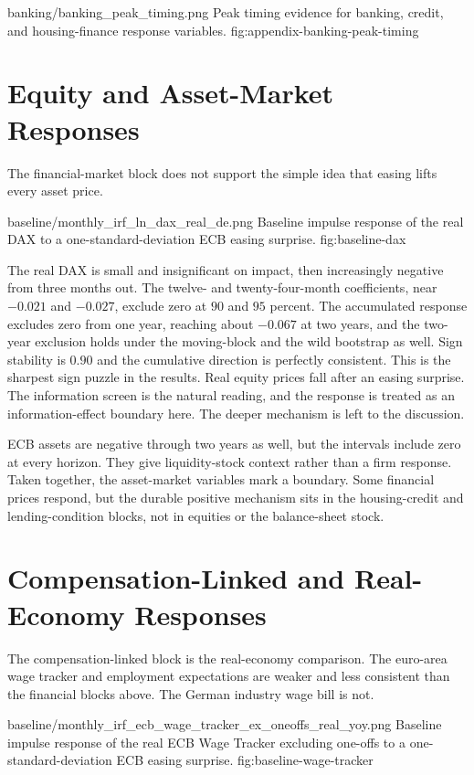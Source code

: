 \thesisfigure
  {banking/banking_peak_timing.png}
  {Peak timing evidence for banking, credit, and housing-finance response variables.}
  {fig:appendix-banking-peak-timing}

\section{Equity and Asset-Market Responses}

The financial-market block does not support the simple idea that easing lifts every asset price.

\thesisfigure
  {baseline/monthly_irf_ln_dax_real_de.png}
  {Baseline impulse response of the real DAX to a one-standard-deviation ECB easing surprise.}
  {fig:baseline-dax}

The real DAX is small and insignificant on impact, then increasingly negative from three months out. The twelve- and twenty-four-month coefficients, near \(-0.021\) and \(-0.027\), exclude zero at \(90\) and \(95\) percent. The accumulated response excludes zero from one year, reaching about \(-0.067\) at two years, and the two-year exclusion holds under the moving-block and the wild bootstrap as well. Sign stability is \(0.90\) and the cumulative direction is perfectly consistent. This is the sharpest sign puzzle in the results. Real equity prices fall after an easing surprise. The information screen is the natural reading, and the response is treated as an information-effect boundary here. The deeper mechanism is left to the discussion.

ECB assets are negative through two years as well, but the intervals include zero at every horizon. They give liquidity-stock context rather than a firm response. Taken together, the asset-market variables mark a boundary. Some financial prices respond, but the durable positive mechanism sits in the housing-credit and lending-condition blocks, not in equities or the balance-sheet stock.

\section{Compensation-Linked and Real-Economy Responses}

The compensation-linked block is the real-economy comparison. The euro-area wage tracker and employment expectations are weaker and less consistent than the financial blocks above. The German industry wage bill is not.

\thesisfigure
  {baseline/monthly_irf_ecb_wage_tracker_ex_oneoffs_real_yoy.png}
  {Baseline impulse response of the real ECB Wage Tracker excluding one-offs to a one-standard-deviation ECB easing surprise.}
  {fig:baseline-wage-tracker}

